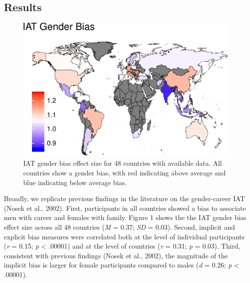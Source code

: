 \documentclass[10pt, letterpaper]{article}
\newenvironment{CodeChunk}{}{}
\begin{document}
\subsection{Results}\label{results}

\begin{CodeChunk}
\begin{figure}[t]

{\centering \includegraphics{figs/map-1} 

}

\caption[IAT gender bias effect size for 48 countries with available data]{IAT gender bias effect size for 48 countries with available data. All countries show a gender bias, with red indicating above average and blue indicating below average bias.}\label{fig:map}
\end{figure}
\end{CodeChunk}

Broadly, we replicate previous findings in the literature on the
gender-career IAT (Nosek et al., 2002). First, participants in all
countries showed a bias to associate men with career and females with
family. Figure 1 shows the the IAT gender bias effect size across all 48
countries (\emph{M} = 0.37; \emph{SD} = 0.03). Second, implicit and
explicit bias measures were correlated both at the level of individual
participants (\emph{r} = 0.15; \emph{p} \textless{} .00001) and at the
level of countries (\emph{r} = 0.31; \emph{p} = 0.03). Third, consistent
with previous findings (Nosek et al., 2002), the magnitude of the
implicit bias is larger for female participants compared to males
(\emph{d} = 0.26; \emph{p} \textless{} .00001).
\end{document}
